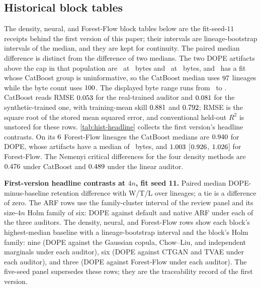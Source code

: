 \documentclass{article}
\begin{document}
\subsection{Historical block tables}
\label{app:blocks}
The density, neural, and Forest-Flow block tables below are the fit-seed-$11$ receipts behind the first version of this paper; their intervals are lineage-bootstrap intervals of the median, and they are kept for continuity. The paired median difference is distinct from the difference of two medians. The two DOPE artifacts above the cap in that population are \MissA\ at \MissABytes\ bytes and \MissB\ at \MissBBytes\ bytes, and \NotInfName\ has a fit whose CatBoost group is uninformative, so the CatBoost median uses $97$ lineages while the byte count uses $100$. The displayed byte range runs from \DopeByteLo\ to \DopeByteHi. CatBoost reads RMSE $0.053$ for the real-trained auditor and $0.081$ for the synthetic-trained one, with training-mean skill $0.881$ and $0.792$; RMSE is the square root of the stored mean squared error, and conventional held-out $R^2$ is unstored for these rows. \cref{tab:hist-headline} collects the first version's headline contrasts. On its $6$ Forest-Flow lineages the CatBoost medians are $0.940$ for DOPE, whose artifacts have a median of \DopeForestByteMedian\ bytes, and $1.003$ [$0.926$, $1.026$] for Forest-Flow. The Nemenyi critical differences for the four density methods are $0.476$ under CatBoost and $0.489$ under the linear auditor.

\begin{table}[t]
\caption{\textbf{First-version headline contrasts at $4n$, fit seed 11.} Paired median DOPE-minus-baseline retention difference with W/T/L over lineages; a tie is a difference of zero. The ARF rows use the family-cluster interval of the review panel and its size-$4n$ Holm family of six: DOPE against default and native ARF under each of the three auditors. The density, neural, and Forest-Flow rows show each block's highest-median baseline with a lineage-bootstrap interval and the block's Holm family: nine (DOPE against the Gaussian copula, Chow--Liu, and independent marginals under each auditor), six (DOPE against CTGAN and TVAE under each auditor), and three (DOPE against Forest-Flow under each auditor). The five-seed panel supersedes these rows; they are the traceability record of the first version.}
\label{tab:hist-headline}
\centering
\footnotesize
\setlength{\tabcolsep}{3pt}
\resizebox{\linewidth}{!}{\begin{minipage}{7.16in}\end{minipage}}
\end{table}
\end{document}
